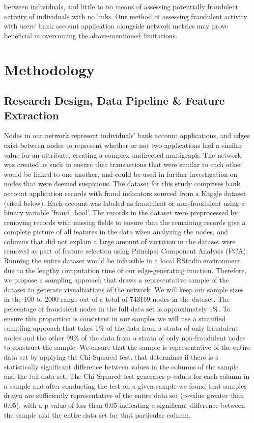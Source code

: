 \documentclass{styles/svproc}
\begin{document}
between individuals, and little to no means of assessing potentially fraudulent activity of individuals with no links. Our method of assessing fraudulent activity with users' bank account application alongside network metrics may prove beneficial in overcoming the above-mentioned limitations. 

\section{Methodology}

\subsection*{Research Design, Data Pipeline \& Feature Extraction}
Nodes in our network represent individuals' bank account applications, and edges exist between nodes to represent whether or not two applications had a similar value for an attribute, creating a complex undirected multigraph. The network was created as such to ensure that transactions that were similar to each other would be linked to one another, and could be used in further investigation on nodes that were deemed suspicious. The dataset for this study comprises bank account application records with fraud indicators sourced from a Kaggle dataset (cited below). Each account was labeled as fraudulent or non-fraudulent using a binary variable ’fraud\_bool’. The records in the dataset were preprocessed by removing records with missing fields to ensure that the remaining records give a complete picture of all features in the data when analyzing the nodes, and columns that did not explain a large amount of variation in the dataset were removed as part of feature selection using Principal Component Analysis (PCA). Running the entire dataset would be infeasible in a local RStudio environment due to the lengthy computation time of our edge-generating function. Therefore, we propose a sampling approach that draws a representative sample of the dataset to generate visualizations of the network. We will keep our sample sizes in the 100 to 2000 range out of a total of 743169 nodes in the dataset. The percentage of fraudulent nodes in the full data set is approximately 1\%. To ensure this proportion is consistent in our samples we will use a stratified sampling approach that takes 1\% of the data from a strata of only fraudulent nodes and the other 99\% of the data from a strata of only non-fraudulent nodes to construct the sample. We ensure that the sample is representative of the entire data set by applying the Chi-Squared test, that determines if there is a statistically significant difference between values in the columns of the sample and the full data set. The Chi-Squared test generates p-values for each column in a sample and after conducting the test on a given sample we found that samples drawn are sufficiently representative of the entire data set (p-value greater than 0.05), with a p-value of less than 0.05 indicating a significant difference between the sample and the entire data set for that particular column. 
\end{document}
